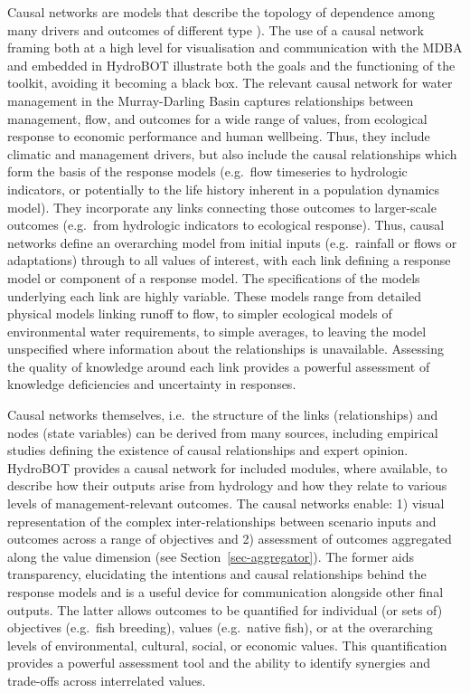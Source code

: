 \documentclass[
  number]{elsarticle}
\begin{document}
Causal networks are models that describe the topology of dependence
among many drivers and outcomes of different type
\citep{peeters2022})\citep{Martínez2019}. The use of a causal network
framing both at a high level for visualisation and communication with
the MDBA and embedded in HydroBOT illustrate both the goals and the
functioning of the toolkit, avoiding it becoming a black box. The
relevant causal network for water management in the Murray-Darling Basin
captures relationships between management, flow, and outcomes for a wide
range of values, from ecological response to economic performance and
human wellbeing. Thus, they include climatic and management drivers, but
also include the causal relationships which form the basis of the
response models (e.g.~flow timeseries to hydrologic indicators, or
potentially to the life history inherent in a population dynamics
model). They incorporate any links connecting those outcomes to
larger-scale outcomes (e.g.~from hydrologic indicators to ecological
response). Thus, causal networks define an overarching model from
initial inputs (e.g.~rainfall or flows or adaptations) through to all
values of interest, with each link defining a response model or
component of a response model. The specifications of the models
underlying each link are highly variable. These models range from
detailed physical models linking runoff to flow, to simpler ecological
models of environmental water requirements, to simple averages, to
leaving the model unspecified where information about the relationships
is unavailable. Assessing the quality of knowledge around each link
provides a powerful assessment of knowledge deficiencies and uncertainty
in responses.

Causal networks themselves, i.e.~the structure of the links
(relationships) and nodes (state variables) can be derived from many
sources, including empirical studies defining the existence of causal
relationships and expert opinion. HydroBOT provides a causal network for
included modules, where available, to describe how their outputs arise
from hydrology and how they relate to various levels of
management-relevant outcomes. The causal networks enable: 1) visual
representation of the complex inter-relationships between scenario
inputs and outcomes across a range of objectives and 2) assessment of
outcomes aggregated along the value dimension (see
Section~\ref{sec-aggregator}). The former aids transparency, elucidating
the intentions and causal relationships behind the response models and
is a useful device for communication alongside other final outputs. The
latter allows outcomes to be quantified for individual (or sets of)
objectives (e.g.~fish breeding), values (e.g.~native fish), or at the
overarching levels of environmental, cultural, social, or economic
values. This quantification provides a powerful assessment tool and the
ability to identify synergies and trade-offs across interrelated values.
\end{document}
